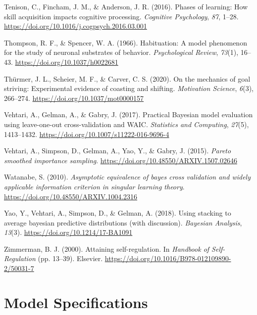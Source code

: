 \documentclass[
  man,
  floatsintext,
  longtable,
  nolmodern,
  notxfonts,
  notimes,
  colorlinks=true,linkcolor=blue,citecolor=blue,urlcolor=blue]{apa7}
\newlength{\cslhangindent}
\newenvironment{CSLReferences}[2] %
 {\begin{list}{}{%
  \setlength{\itemindent}{0pt}
  \setlength{\leftmargin}{0pt}
  \setlength{\parsep}{0pt}
  \ifodd #1
   \setlength{\leftmargin}{\cslhangindent}
   \setlength{\itemindent}{-1\cslhangindent}
  \fi
  \setlength{\itemsep}{#2\baselineskip}}}
 {\end{list}}
\begin{document}
\begin{CSLReferences}{1}{0}
Tenison, C., Fincham, J. M., \& Anderson, J. R. (2016). Phases of
learning: {How} skill acquisition impacts cognitive processing.
\emph{Cognitive Psychology}, \emph{87}, 1--28.
\url{https://doi.org/10.1016/j.cogpsych.2016.03.001}

Thompson, R. F., \& Spencer, W. A. (1966). Habituation: {A} model
phenomenon for the study of neuronal substrates of behavior.
\emph{Psychological Review}, \emph{73}(1), 16--43.
\url{https://doi.org/10.1037/h0022681}

Thürmer, J. L., Scheier, M. F., \& Carver, C. S. (2020). On the
mechanics of goal striving: {Experimental} evidence of coasting and
shifting. \emph{Motivation Science}, \emph{6}(3), 266--274.
\url{https://doi.org/10.1037/mot0000157}

Vehtari, A., Gelman, A., \& Gabry, J. (2017). Practical {Bayesian} model
evaluation using leave-one-out cross-validation and {WAIC}.
\emph{Statistics and Computing}, \emph{27}(5), 1413--1432.
\url{https://doi.org/10.1007/s11222-016-9696-4}

Vehtari, A., Simpson, D., Gelman, A., Yao, Y., \& Gabry, J. (2015).
\emph{Pareto smoothed importance sampling}.
\url{https://doi.org/10.48550/ARXIV.1507.02646}

Watanabe, S. (2010). \emph{Asymptotic equivalence of bayes cross
validation and widely applicable information criterion in singular
learning theory}. \url{https://doi.org/10.48550/ARXIV.1004.2316}

Yao, Y., Vehtari, A., Simpson, D., \& Gelman, A. (2018). Using stacking
to average bayesian predictive distributions (with discussion).
\emph{Bayesian Analysis}, \emph{13}(3).
\url{https://doi.org/10.1214/17-BA1091}

Zimmerman, B. J. (2000). Attaining self-regulation. In \emph{Handbook of
{Self-Regulation}} (pp. 13--39). Elsevier.
\url{https://doi.org/10.1016/B978-012109890-2/50031-7}

\end{CSLReferences}

\appendix

\section{Model Specifications}\label{apx-a}
\end{document}
